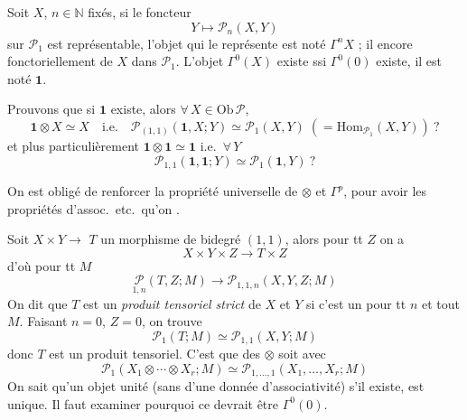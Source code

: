 \documentclass[11pt,a4paper]{article}
\begin{document}
Soit $X$, $n \in \mathbb{N}$ fixés, si le foncteur
\[
Y \longmapsto \mathcal{P}_n(X, Y)
\]
sur $\mathcal{P}_1$ est représentable, l'objet qui le représente est noté
$\Gamma^{n} X$ ; il  encore fonctoriellement de $X$ dans
$\mathcal{P}_1$. L'objet $\Gamma^{0}(X)$ existe ssi $\Gamma^{0}(0)$
existe, il est noté $\mathbf{1}$.

Prouvons que \struck{\ill{}} si $\mathbf{1}$ existe, alors
$\forall\, X \in \mathrm{Ob}\,\mathcal{P}$,
\[
\mathbf{1} \otimes X \simeq X \quad \text{i.e.} \quad
\mathcal{P}_{(1,1)}(\mathbf{1}, X; Y) \simeq \mathcal{P}_1(X, Y)
\; (= \mathrm{Hom}_{\mathcal{P}_1}(X, Y)) \ ?
\]
et plus particulièrement $\mathbf{1} \otimes \mathbf{1} \simeq
\mathbf{1}$ i.e.\ $\forall\, Y$
\[
\mathcal{P}_{1,1}(\mathbf{1}, \mathbf{1}; Y) \simeq
\mathcal{P}_1(\mathbf{1}, Y) \ ?
\]

On est obligé de renforcer la propriété universelle de $\otimes$ et
$\Gamma^{p}$, pour avoir les propriétés d'assoc.\ etc.\ qu'on
.

Soit $X \times Y \to$ \struck{\ill{}} $T$ un morphisme de bidegré
$(1,1)$, alors pour tt $Z$ on a
\[
X \times Y \times Z \longrightarrow T \times Z
\]
d'où pour tt $M$
\[
\underset{1,n}{\mathcal{P}}(T, Z; M) \longrightarrow
\mathcal{P}_{1,1,n}(X, Y, Z; M)
\]
On dit que $T$ est un \emph{produit tensoriel strict} de $X$ et $Y$ si
c'est un  
pour tt $n$ et tout $M$. Faisant $n = 0$, $Z = 0$, on trouve
\[
\mathcal{P}_{1}(T; M) \simeq \mathcal{P}_{1,1}(X, Y; M)
\]
donc $T$ est un produit tensoriel. C'est
   que \ill{} des
$\otimes$  \struck{\ill{}} \ill{} \ill{} \ill{}
  
\struck{\ill{} \ill{} \ill{}} \ill{} \ill{} soit
 \ill{}  avec
\[
\mathcal{P}_1(X_1 \otimes \cdots \otimes X_r; M) \simeq
\mathcal{P}_{1, \ldots, 1}(X_1, \ldots, X_r; M)
\]
On sait qu'un objet unité (sans  d'une donnée
d'associativité) s'il existe, est unique. Il faut examiner pourquoi ce
devrait être $\Gamma^{0}(0)$.
\end{document}
